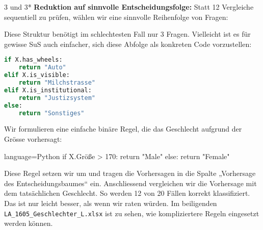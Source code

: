 \begin{aufgabe}{3 und 3*}
\textbf{Reduktion auf sinnvolle Entscheidungsfolge:} Statt 12 Vergleiche sequentiell zu prüfen, wählen wir eine sinnvolle Reihenfolge von Fragen:

\begin{center}
\end{center}

Diese Struktur benötigt im schlechtesten Fall nur 3 Fragen. Vielleicht ist es für gewisse SuS auch einfacher, sich diese Abfolge als konkreten Code vorzustellen:

\begin{lstlisting}[language=Python]
if X.has_wheels:
    return "Auto"
elif X.is_visible:
    return "Milchstrasse"
elif X.is_institutional:
    return "Justizsystem"
else:
    return "Sonstiges"
\end{lstlisting}
\end{aufgabe}


\begin{aufgabe}{4}
Wir formulieren eine einfache binäre Regel, die das Geschlecht aufgrund der Grösse vorhersagt:

\begin{lstlsting}{language=Python}
if X.Größe > 170:
    return "Male"
else:
    return "Female"
\end{lstlsting}

Diese Regel setzen wir um und tragen die Vorhersagen in die Spalte „Vorhersage des Entscheidungsbaumes“ ein. Anschliessend vergleichen wir die Vorhersage mit dem tatsächlichen Geschlecht. So werden 12 von 20 Fällen korrekt klassifiziert. Das ist nur leicht besser, als wenn wir raten würden. Im beiligenden \texttt{LA\_1605\_Geschlechter\_L.xlsx} ist zu sehen, wie kompliziertere Regeln eingesetzt werden können. 
\end{aufgabe}


